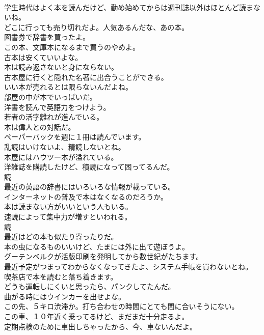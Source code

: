 \documentclass[8pt]{extreport}
\begin{document}
\begin{CJK}{UTF8}{min}
\\	学生時代はよく本を読んだけど、勤め始めてからは週刊誌以外はほとんど読まないね。	
\\	どこに行っても売り切れだよ。人気あるんだな、あの本。	
\\	図書券で辞書を買ったよ。	
\\	この本、文庫本になるまで買うのやめよ。	
\\	古本は安くていいよな。	
\\	本は読み返さないと身にならない。	
\\	古本屋に行くと隠れた名著に出合うことができる。	
\\	いい本が売れるとは限らないんだよね。	
\\	部屋の中が本でいっぱいだ。	
\\	洋書を読んで英語力をつけよう。	
\\	若者の活字離れが進んでいる。	
\\	本は偉人との対話だ。	
\\	ペーパーバックを週に１冊は読んでいます。	
\\	乱読はいけないよ、精読しないとね。	
\\	本屋にはハウツー本が溢れている。	
\\	洋雑誌を購読したけど、積読になって困ってるんだ。	
\\	読
\\	最近の英語の辞書にはいろいろな情報が載っている。	
\\	インターネットの普及で本はなくなるのだろうか。	
\\	本は読まない方がいいという人もいる。	
\\	速読によって集中力が増すといわれる。	
\\	読
\\	最近はどの本も似たり寄ったりだ。	
\\	本の虫になるものいいけど、たまには外に出て遊ぼうよ。	
\\	グーテンベルクが活版印刷を発明してから数世紀がたちます。	
\\	最近予定がつまってわからなくなってきたよ、システム手帳を買わないとね。	
\\	喫茶店で本を読むと落ち着きます。	
\\	どうも運転しにくいと思ったら、パンクしてたんだ。	
\\	曲がる時にはウインカーを出せよな。	
\\	この先、５キロ渋滞か。打ち合わせの時間にとても間に合いそうにない。	
\\	この車、１０年近く乗ってるけど、まだまだ十分走るよ。	
\\	定期点検のために車出しちゃったから、今、車ないんだよ。	

\end{CJK}
\end{document}
